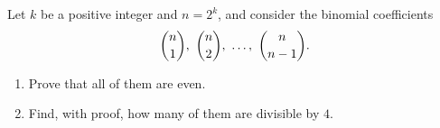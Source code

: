 Let $k$ be a positive integer and $n=2^k$, and consider the binomial coefficients
\[\dbinom n1,\ \dbinom n2,\ \dots,\ \dbinom n{n-1}.\]
\begin{enumerate}
\item[(a)] Prove that all of them are even.
\item[(b)] Find, with proof, how many of them are divisible by $4$.
\end{enumerate}
